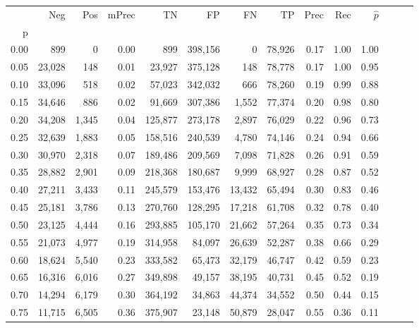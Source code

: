\begin{tabular}{rrrrrrrrrrrrrr}
\toprule
{} &     Neg &    Pos & mPrec &       TN &       FP &      FN &      TP &  Prec &   Rec & $\hat{p}$ \\
p    &         &        &       &          &          &         &         &       &       &           \\
\midrule
0.00 &     899 &      0 &  0.00 &      899 &  398,156 &       0 &  78,926 &  0.17 &  1.00 &      1.00 \\
0.05 &  23,028 &    148 &  0.01 &   23,927 &  375,128 &     148 &  78,778 &  0.17 &  1.00 &      0.95 \\
0.10 &  33,096 &    518 &  0.02 &   57,023 &  342,032 &     666 &  78,260 &  0.19 &  0.99 &      0.88 \\
0.15 &  34,646 &    886 &  0.02 &   91,669 &  307,386 &   1,552 &  77,374 &  0.20 &  0.98 &      0.80 \\
0.20 &  34,208 &  1,345 &  0.04 &  125,877 &  273,178 &   2,897 &  76,029 &  0.22 &  0.96 &      0.73 \\
0.25 &  32,639 &  1,883 &  0.05 &  158,516 &  240,539 &   4,780 &  74,146 &  0.24 &  0.94 &      0.66 \\
0.30 &  30,970 &  2,318 &  0.07 &  189,486 &  209,569 &   7,098 &  71,828 &  0.26 &  0.91 &      0.59 \\
0.35 &  28,882 &  2,901 &  0.09 &  218,368 &  180,687 &   9,999 &  68,927 &  0.28 &  0.87 &      0.52 \\
0.40 &  27,211 &  3,433 &  0.11 &  245,579 &  153,476 &  13,432 &  65,494 &  0.30 &  0.83 &      0.46 \\
0.45 &  25,181 &  3,786 &  0.13 &  270,760 &  128,295 &  17,218 &  61,708 &  0.32 &  0.78 &      0.40 \\
0.50 &  23,125 &  4,444 &  0.16 &  293,885 &  105,170 &  21,662 &  57,264 &  0.35 &  0.73 &      0.34 \\
0.55 &  21,073 &  4,977 &  0.19 &  314,958 &   84,097 &  26,639 &  52,287 &  0.38 &  0.66 &      0.29 \\
0.60 &  18,624 &  5,540 &  0.23 &  333,582 &   65,473 &  32,179 &  46,747 &  0.42 &  0.59 &      0.23 \\
0.65 &  16,316 &  6,016 &  0.27 &  349,898 &   49,157 &  38,195 &  40,731 &  0.45 &  0.52 &      0.19 \\
0.70 &  14,294 &  6,179 &  0.30 &  364,192 &   34,863 &  44,374 &  34,552 &  0.50 &  0.44 &      0.15 \\
0.75 &  11,715 &  6,505 &  0.36 &  375,907 &   23,148 &  50,879 &  28,047 &  0.55 &  0.36 &      0.11 \\

\end{tabular}
